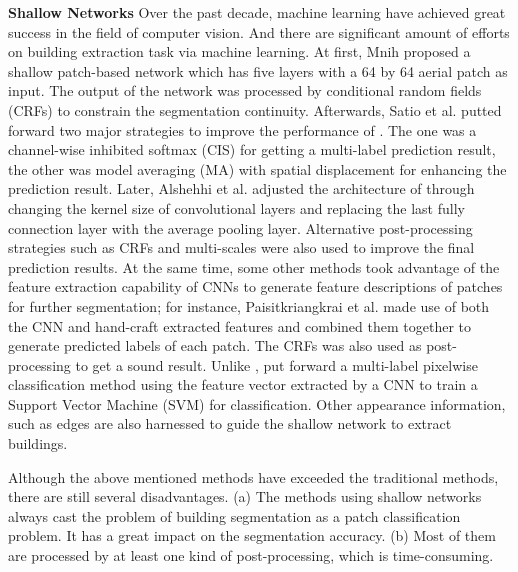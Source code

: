 \textbf{Shallow Networks} Over the past decade, machine learning have achieved great success in the field of computer vision.
And there are significant amount of efforts on building extraction task via machine learning.
At first, Mnih \cite{IEEEexample:mnih2013machine} proposed a shallow patch-based network which has five layers with a 64 by 64 aerial patch as input.
The output of the network was processed by conditional random fields (CRFs) to constrain the segmentation continuity.
Afterwards, Satio et al. \cite{IEEEexample:saito2016multiple} putted forward two major strategies to improve the performance of \cite{IEEEexample:mnih2013machine}.
The one was a channel-wise inhibited softmax (CIS) for getting a multi-label prediction result, the other was model averaging (MA) with spatial displacement for enhancing the prediction result.
Later, Alshehhi et al. \cite{IEEEexample:alshehhi2017simultaneous} adjusted the architecture of \cite{IEEEexample:mnih2013machine} through changing the kernel size of convolutional layers and replacing the last fully connection layer with the average pooling layer.
Alternative post-processing strategies such as CRFs and multi-scales were also used to improve the final prediction results.
At the same time, some other methods took advantage of the feature extraction capability of CNNs to generate feature descriptions of patches for further segmentation; for instance,
Paisitkriangkrai et al. \cite{IEEEexample:paisitkriangkrai2015effective} made use of both the CNN and hand-craft extracted features and combined them together to generate predicted labels of each patch.
The CRFs was also used as post-processing to get a sound result.
Unlike \cite{IEEEexample:paisitkriangkrai2015effective}, \cite{IEEEexample:he2017multi} put forward a multi-label pixelwise classification method using the feature vector extracted by a CNN to train a Support Vector Machine (SVM) for classification.
Other appearance information, such as edges \cite{IEEEexample:zhao2017contextually} are also harnessed to guide the shallow network to extract buildings.


Although the above mentioned methods have exceeded the traditional methods, there are still several disadvantages. 
(a) The methods using shallow networks always cast the problem of building segmentation as a patch classification problem. It has a great impact on the segmentation accuracy.
(b) Most of them are processed by at least one kind of post-processing, which is time-consuming.

